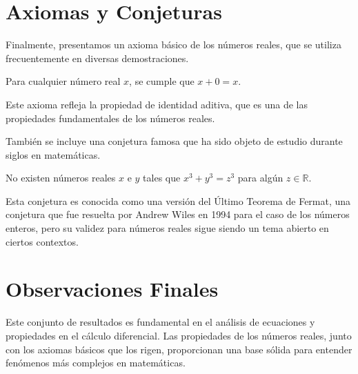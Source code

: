 \section{Axiomas y Conjeturas}

Finalmente, presentamos un axioma básico de los números reales, que se utiliza frecuentemente en diversas demostraciones.

\begin{axiom}
Para cualquier número real $x$, se cumple que $x + 0 = x$.
\end{axiom}

Este axioma refleja la propiedad de identidad aditiva, que es una de las propiedades fundamentales de los números reales.

También se incluye una conjetura famosa que ha sido objeto de estudio durante siglos en matemáticas.

\begin{conjecture}
No existen números reales $x$ e $y$ tales que $x^3 + y^3 = z^3$ para algún $z \in \mathbb{R}$.
\end{conjecture}

Esta conjetura es conocida como una versión del Último Teorema de Fermat, una conjetura que fue resuelta por Andrew Wiles en 1994 para el caso de los números enteros, pero su validez para números reales sigue siendo un tema abierto en ciertos contextos.

\section{Observaciones Finales}

\begin{remark}
Este conjunto de resultados es fundamental en el análisis de ecuaciones y propiedades en el cálculo diferencial. Las propiedades de los números reales, junto con los axiomas básicos que los rigen, proporcionan una base sólida para entender fenómenos más complejos en matemáticas.
\end{remark}


